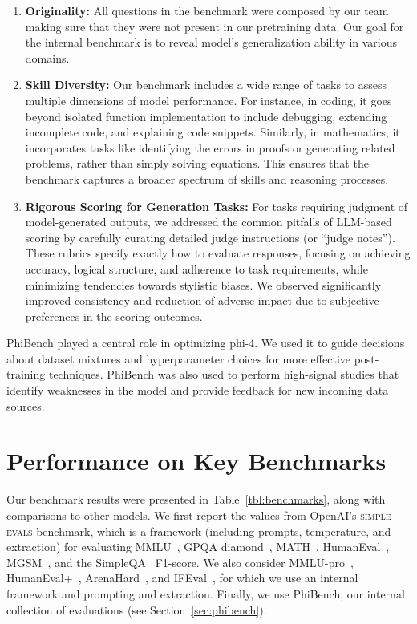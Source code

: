 \documentclass[11pt]{article}
\newcommand{\modelwithoutspace}{\textsf{phi-4}}
\begin{document}
\begin{enumerate}
    \item \textbf{Originality:} All questions in the benchmark were composed by our team making sure that they were not present in our pretraining data. Our goal for the internal benchmark is to reveal model's generalization ability in various domains.
    \item \textbf{Skill Diversity:} Our benchmark includes a wide range of tasks to assess multiple dimensions of model performance. For instance, in coding, it goes beyond isolated function implementation to include debugging, extending incomplete code, and explaining code snippets. Similarly, in mathematics, it incorporates tasks like identifying the errors in proofs or generating related problems, rather than simply solving equations. This ensures that the benchmark captures a broader spectrum of skills and reasoning processes.
     \item \textbf{Rigorous Scoring for Generation Tasks:} For tasks requiring judgment of model-generated outputs, we addressed the common pitfalls of LLM-based scoring by carefully curating detailed judge instructions (or “judge notes”). These rubrics specify exactly how to evaluate responses, focusing on achieving accuracy, logical structure, and adherence to task requirements, while minimizing tendencies towards stylistic biases. We observed significantly improved consistency and reduction of adverse impact due to subjective preferences in the scoring outcomes.
\end{enumerate}

PhiBench played a central role in optimizing \modelwithoutspace. We used it to guide  decisions about dataset mixtures and hyperparameter choices for more effective post-training techniques. PhiBench was also used to perform high-signal studies that identify weaknesses in the model and provide feedback for new incoming data sources. 

\section{Performance on Key Benchmarks}

Our benchmark results were presented in Table~\ref{tbl:benchmarks}, along with comparisons to other models.   We first report the values from OpenAI's \textsc{simple-evals} benchmark, which is a framework (including prompts, temperature, and extraction) for evaluating 
MMLU~\cite{hendrycks2020}, 
GPQA diamond~\cite{rein2023gpqa},
MATH~\cite{hendrycksmath2021},
HumanEval~\cite{humaneval},
MGSM~\cite{mgsm},
and the SimpleQA~\cite{simpleqa} F1-score.  We also consider MMLU-pro~\cite{mmlupro}, HumanEval+~\cite{evalplus}, ArenaHard~\cite{chiang2024chatbot}, and IFEval~\cite{ifeval}, for which we use an internal framework and prompting and extraction.  Finally, we use PhiBench, our internal collection of evaluations (see Section~\ref{sec:phibench}).
\end{document}
